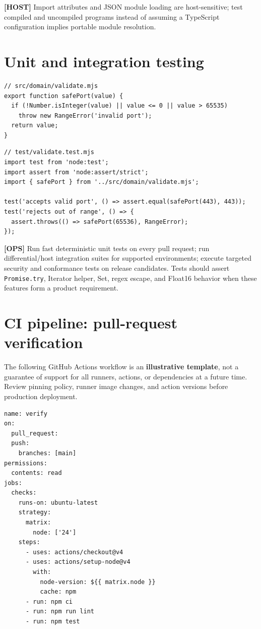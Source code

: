 \documentclass[11pt,letterpaper]{article}
\newcommand{\passthrough}[1]{#1}
\begin{document}
\textbf{{[}HOST{]}} Import attributes and JSON module loading are host-sensitive; test compiled and uncompiled programs instead of assuming a TypeScript configuration implies portable module resolution.

\section{Unit and integration testing}\label{unit-and-integration-testing}

\begin{lstlisting}
// src/domain/validate.mjs
export function safePort(value) {
  if (!Number.isInteger(value) || value <= 0 || value > 65535)
    throw new RangeError('invalid port');
  return value;
}
\end{lstlisting}

\begin{lstlisting}
// test/validate.test.mjs
import test from 'node:test';
import assert from 'node:assert/strict';
import { safePort } from '../src/domain/validate.mjs';

test('accepts valid port', () => assert.equal(safePort(443), 443));
test('rejects out of range', () => {
  assert.throws(() => safePort(65536), RangeError);
});
\end{lstlisting}

\textbf{{[}OPS{]}} Run fast deterministic unit tests on every pull request; run differential/host integration suites for supported environments; execute targeted security and conformance tests on release candidates. Tests should assert \passthrough{\lstinline!Promise.try!}, Iterator helper, Set, regex escape, and Float16 behavior when these features form a product requirement.

\section{CI pipeline: pull-request verification}\label{ci-pipeline-pull-request-verification}

The following GitHub Actions workflow is an \textbf{illustrative template}, not a guarantee of support for all runners, actions, or dependencies at a future time. Review pinning policy, runner image changes, and action versions before production deployment.

\begin{lstlisting}
name: verify
on:
  pull_request:
  push:
    branches: [main]
permissions:
  contents: read
jobs:
  checks:
    runs-on: ubuntu-latest
    strategy:
      matrix:
        node: ['24']
    steps:
      - uses: actions/checkout@v4
      - uses: actions/setup-node@v4
        with:
          node-version: ${{ matrix.node }}
          cache: npm
      - run: npm ci
      - run: npm run lint
      - run: npm test
\end{lstlisting}
\end{document}
